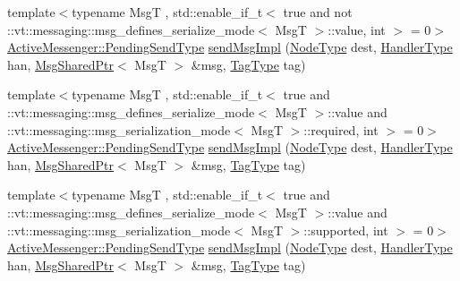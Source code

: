 \begin{DoxyCompactItemize}
\item 
{\footnotesize template$<$typename MsgT , std\+::enable\+\_\+if\+\_\+t$<$ true and not \+::vt\+::messaging\+::msg\+\_\+defines\+\_\+serialize\+\_\+mode$<$ Msg\+T $>$\+::value, int $>$  = 0$>$ }\\\hyperlink{structvt_1_1messaging_1_1_active_messenger_a3626a6ca76d8ad4ec7c3b47a2c70d3a8}{Active\+Messenger\+::\+Pending\+Send\+Type} \hyperlink{structvt_1_1messaging_1_1_active_messenger_aae60feeb3e184a5a77d9be6e7c43d91a}{send\+Msg\+Impl} (\hyperlink{namespacevt_a866da9d0efc19c0a1ce79e9e492f47e2}{Node\+Type} dest, \hyperlink{namespacevt_af64846b57dfcaf104da3ef6967917573}{Handler\+Type} han, \hyperlink{structvt_1_1messaging_1_1_msg_shared_ptr}{Msg\+Shared\+Ptr}$<$ MsgT $>$ \&msg, \hyperlink{namespacevt_a84ab281dae04a52a4b243d6bf62d0e52}{Tag\+Type} tag)
\item 
{\footnotesize template$<$typename MsgT , std\+::enable\+\_\+if\+\_\+t$<$ true and \+::vt\+::messaging\+::msg\+\_\+defines\+\_\+serialize\+\_\+mode$<$ Msg\+T $>$\+::value and \+::vt\+::messaging\+::msg\+\_\+serialization\+\_\+mode$<$ Msg\+T $>$\+::required, int $>$  = 0$>$ }\\\hyperlink{structvt_1_1messaging_1_1_active_messenger_a3626a6ca76d8ad4ec7c3b47a2c70d3a8}{Active\+Messenger\+::\+Pending\+Send\+Type} \hyperlink{structvt_1_1messaging_1_1_active_messenger_aae60feeb3e184a5a77d9be6e7c43d91a}{send\+Msg\+Impl} (\hyperlink{namespacevt_a866da9d0efc19c0a1ce79e9e492f47e2}{Node\+Type} dest, \hyperlink{namespacevt_af64846b57dfcaf104da3ef6967917573}{Handler\+Type} han, \hyperlink{structvt_1_1messaging_1_1_msg_shared_ptr}{Msg\+Shared\+Ptr}$<$ MsgT $>$ \&msg, \hyperlink{namespacevt_a84ab281dae04a52a4b243d6bf62d0e52}{Tag\+Type} tag)
\item 
{\footnotesize template$<$typename MsgT , std\+::enable\+\_\+if\+\_\+t$<$ true and \+::vt\+::messaging\+::msg\+\_\+defines\+\_\+serialize\+\_\+mode$<$ Msg\+T $>$\+::value and \+::vt\+::messaging\+::msg\+\_\+serialization\+\_\+mode$<$ Msg\+T $>$\+::supported, int $>$  = 0$>$ }\\\hyperlink{structvt_1_1messaging_1_1_active_messenger_a3626a6ca76d8ad4ec7c3b47a2c70d3a8}{Active\+Messenger\+::\+Pending\+Send\+Type} \hyperlink{structvt_1_1messaging_1_1_active_messenger_aae60feeb3e184a5a77d9be6e7c43d91a}{send\+Msg\+Impl} (\hyperlink{namespacevt_a866da9d0efc19c0a1ce79e9e492f47e2}{Node\+Type} dest, \hyperlink{namespacevt_af64846b57dfcaf104da3ef6967917573}{Handler\+Type} han, \hyperlink{structvt_1_1messaging_1_1_msg_shared_ptr}{Msg\+Shared\+Ptr}$<$ MsgT $>$ \&msg, \hyperlink{namespacevt_a84ab281dae04a52a4b243d6bf62d0e52}{Tag\+Type} tag)

\end{DoxyCompactItemize}
